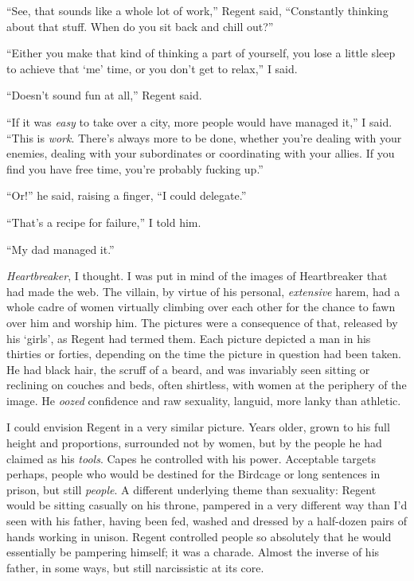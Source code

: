 ``See, that sounds like a whole lot of work,'' Regent said, ``Constantly thinking about that stuff.  When do you sit back and chill out?''



``Either you make that kind of thinking a part of yourself, you lose a little sleep to achieve that `me' time, or you don't get to relax,'' I said.



``Doesn't sound fun at all,'' Regent said.



``If it was \emph{easy} to take over a city, more people would have managed it,'' I said.  ``This is \emph{work}.  There's always more to be done, whether you're dealing with your enemies, dealing with your subordinates or coordinating with your allies.  If you find you have free time, you're probably fucking up.''



``Or!'' he said, raising a finger, ``I could delegate.''



``That's a recipe for failure,'' I told him.



``My dad managed it.''



\emph{Heartbreaker}, I thought.  I was put in mind of the images of Heartbreaker that had made the web.  The villain, by virtue of his personal, \emph{extensive} harem, had a whole cadre of women virtually climbing over each other for the chance to fawn over him and worship him.  The pictures were a consequence of that, released by his `girls', as Regent had termed them.  Each picture depicted a man in his thirties or forties, depending on the time the picture in question had been taken.  He had black hair, the scruff of a beard, and was invariably seen sitting or reclining on couches and beds, often shirtless, with women at the periphery of the image.  He \emph{oozed }confidence and raw sexuality, languid, more lanky than athletic.



I could envision Regent in a very similar picture.  Years older, grown to his full height and proportions, surrounded not by women, but by the people he had claimed as his \emph{tools}.  Capes he controlled with his power.  Acceptable targets perhaps, people who would be destined for the Birdcage or long sentences in prison, but still \emph{people}.  A different underlying theme than sexuality: Regent would be sitting casually on his throne, pampered in a very different way than I'd seen with his father, having been fed, washed and dressed by a half-dozen pairs of hands working in unison.  Regent controlled people so absolutely that he would essentially be pampering himself; it was a charade.  Almost the inverse of his father, in some ways, but still narcissistic at its core.



